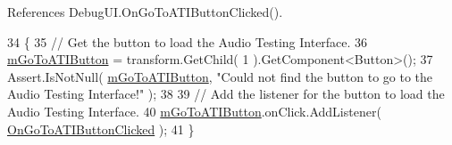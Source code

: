 References Debug\+U\+I.\+On\+Go\+To\+A\+T\+I\+Button\+Clicked().


\begin{DoxyCode}
34     \{
35         \textcolor{comment}{// Get the button to load the Audio Testing Interface.}
36         \hyperlink{group___deb_u_i_priv_var_gaf9bf8d3b03e88b32bf6a567cd95dfafb}{mGoToATIButton} = transform.GetChild( 1 ).GetComponent<Button>();
37         Assert.IsNotNull( \hyperlink{group___deb_u_i_priv_var_gaf9bf8d3b03e88b32bf6a567cd95dfafb}{mGoToATIButton}, \textcolor{stringliteral}{"Could not find the button to go to the Audio
       Testing Interface!"} );
38 
39         \textcolor{comment}{// Add the listener for the button to load the Audio Testing Interface.}
40         \hyperlink{group___deb_u_i_priv_var_gaf9bf8d3b03e88b32bf6a567cd95dfafb}{mGoToATIButton}.onClick.AddListener( \hyperlink{group___deb_u_i_handlers_ga16e95ec9c2c6cc4cecf06e54e316f00c}{OnGoToATIButtonClicked} );
41     \}
\end{DoxyCode}
